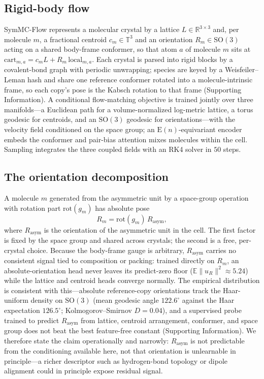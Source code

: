 \documentclass[journal=jcisd8,manuscript=article]{achemso}
\begin{document}
\subsection{Rigid-body flow}
SymMC-Flow represents a molecular crystal by a lattice $L\in\mathbb{R}^{3\times3}$
and, per molecule $m$, a fractional centroid $c_m\in\mathbb{T}^3$ and an
orientation $R_m\in\mathrm{SO}(3)$ acting on a shared body-frame conformer, so that
atom $a$ of molecule $m$ sits at
$\text{cart}_{m,a}=c_mL+R_m\,\text{local}_{m,a}$. Each crystal is parsed into rigid
blocks by a covalent-bond graph with periodic unwrapping; species are keyed by a
Weisfeiler--Leman hash and share one reference conformer rotated into a
molecule-intrinsic frame, so each copy's pose is the Kabsch rotation to that frame
(Supporting Information). A conditional flow-matching
objective\cite{lipman2023flowmatching} is trained jointly over three manifolds---a
Euclidean path for a volume-normalized log-metric lattice, a torus geodesic for
centroids, and an $\mathrm{SO}(3)$ geodesic for orientations---with the velocity
field conditioned on the space group; an $\mathrm{E}(n)$-equivariant
encoder\cite{satorras2021egnn} embeds the conformer and pair-bias attention mixes
molecules within the cell. Sampling integrates the three coupled fields with an
RK4 solver in $50$ steps.

\subsection{The orientation decomposition}\label{sec:decomp}
A molecule $m$ generated from the asymmetric unit by a space-group operation with
rotation part $\mathrm{rot}(g_m)$ has absolute pose
\begin{equation}
R_m = \mathrm{rot}(g_m)\,R_{\text{asym}},
\label{eq:decomp}
\end{equation}
where $R_{\text{asym}}$ is the orientation of the asymmetric unit in the cell. The
first factor is fixed by the space group and shared across crystals; the second is
a free, per-crystal choice. Because the body-frame gauge is arbitrary,
$R_{\text{asym}}$ carries no consistent signal tied to composition or packing:
trained directly on $R_m$, an absolute-orientation head never leaves its
predict-zero floor ($\mathbb{E}\lVert u_R\rVert^2\!\approx\!5.24$) while the
lattice and centroid heads converge normally. The empirical distribution is
consistent with this---absolute reference-copy orientations track the Haar-uniform
density on $\mathrm{SO}(3)$ (mean geodesic angle $122.6^\circ$ against the Haar
expectation $126.5^\circ$; Kolmogorov--Smirnov $D=0.04$), and a supervised probe
trained to predict $R_{\text{asym}}$ from lattice, centroid arrangement, conformer,
and space group does not beat the best feature-free constant (Supporting
Information). We therefore state the claim operationally and narrowly:
$R_{\text{asym}}$ is not predictable from the conditioning available here, not that
orientation is unlearnable in principle---a richer descriptor such as
hydrogen-bond topology or dipole alignment could in principle expose residual
signal.
\end{document}
